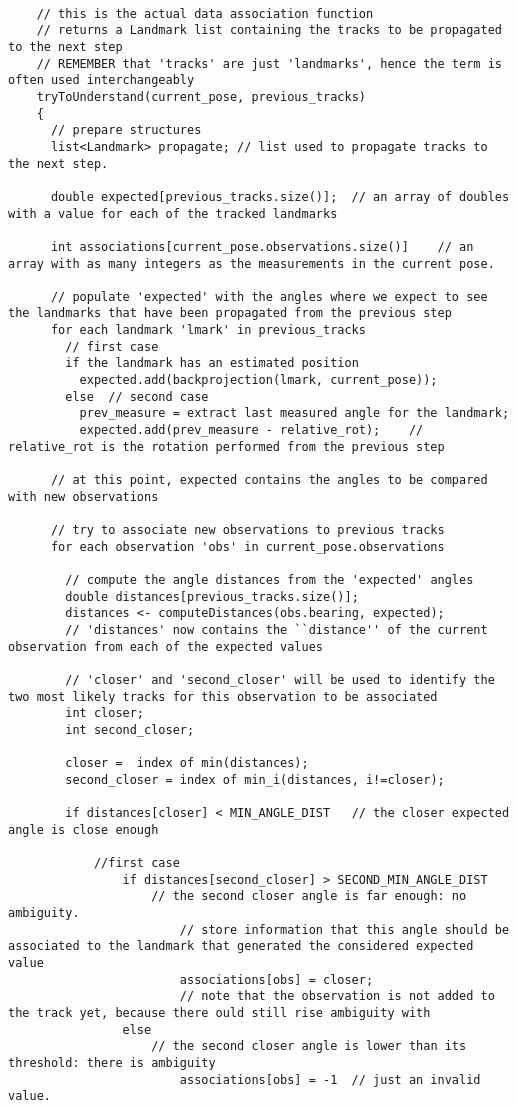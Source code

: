 {\begin{lstlisting}[frame=shadowbox,breaklines]
    
    // this is the actual data association function
    // returns a Landmark list containing the tracks to be propagated to the next step
    // REMEMBER that 'tracks' are just 'landmarks', hence the term is often used interchangeably
    tryToUnderstand(current_pose, previous_tracks)
    {
      // prepare structures
      list<Landmark> propagate;	// list used to propagate tracks to the next step.
      
      double expected[previous_tracks.size()];	// an array of doubles with a value for each of the tracked landmarks
      
      int associations[current_pose.observations.size()]	// an array with as many integers as the measurements in the current pose.
      
      // populate 'expected' with the angles where we expect to see the landmarks that have been propagated from the previous step
      for each landmark 'lmark' in previous_tracks
      	// first case
      	if the landmark has an estimated position
          expected.add(backprojection(lmark, current_pose));
        else  // second case
          prev_measure = extract last measured angle for the landmark;
          expected.add(prev_measure - relative_rot);	// relative_rot is the rotation performed from the previous step
      
      // at this point, expected contains the angles to be compared with new observations
      
      // try to associate new observations to previous tracks
      for each observation 'obs' in current_pose.observations
        
        // compute the angle distances from the 'expected' angles 
        double distances[previous_tracks.size()];
        distances <- computeDistances(obs.bearing, expected);
        // 'distances' now contains the ``distance'' of the current observation from each of the expected values
        
        // 'closer' and 'second_closer' will be used to identify the two most likely tracks for this observation to be associated
        int closer;
        int second_closer;
        
        closer =  index of min(distances);
        second_closer = index of min_i(distances, i!=closer);
        
        if distances[closer] < MIN_ANGLE_DIST	// the closer expected angle is close enough
        	
        	//first case
                if distances[second_closer] > SECOND_MIN_ANGLE_DIST
                	// the second closer angle is far enough: no ambiguity.
                        // store information that this angle should be associated to the landmark that generated the considered expected value
                        associations[obs] = closer;
                        // note that the observation is not added to the track yet, because there ould still rise ambiguity with 
                else
                	// the second closer angle is lower than its threshold: there is ambiguity
                        associations[obs] = -1	// just an invalid value.
                        

\end{lstlisting}}
